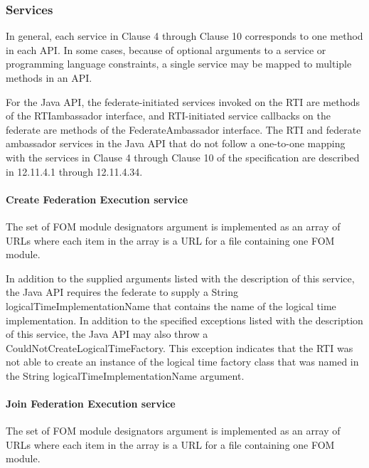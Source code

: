 \begin{compactstdpage}
    \subsubsection{Services}

    In general, each service in Clause 4 through Clause 10 corresponds to one method in each API. In some cases, because of optional arguments to a service or programming language constraints, a single service may be mapped to multiple methods in an API.

    For the Java API, the federate-initiated services invoked on the RTI are methods of the RTIambassador interface, and RTI-initiated service callbacks on the federate are methods of the FederateAmbassador interface. The RTI and federate ambassador services in the Java API that do not follow a one-to-one mapping with the services in Clause 4 through Clause 10 of the specification are described in 12.11.4.1 through 12.11.4.34.

    \paragraph{Create Federation Execution service}

    The set of FOM module designators argument is implemented as an array of URLs where each item in the array is a URL for a file containing one FOM module.

    In addition to the supplied arguments listed with the description of this service, the Java API requires the federate to supply a String logicalTimeImplementationName that contains the name of the logical time implementation. In addition to the specified exceptions listed with the description of this service, the Java API may also throw a CouldNotCreateLogicalTimeFactory. This exception indicates that the RTI was not able to create an instance of the logical time factory class that was named in the String logicalTimeImplementationName argument.

    \paragraph{Join Federation Execution service}

    The set of FOM module designators argument is implemented as an array of URLs where each item in the array is a URL for a file containing one FOM module.


\end{compactstdpage}
